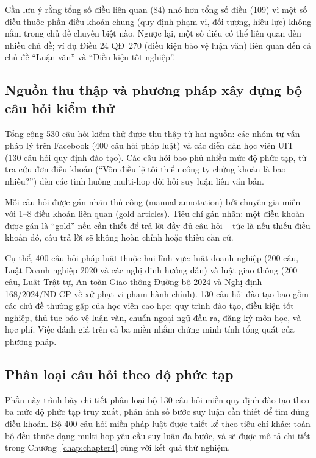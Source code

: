 Cần lưu ý rằng tổng số điều liên quan (84) nhỏ hơn tổng số điều (109) vì một số
điều thuộc phần điều khoản chung (quy định phạm vi, đối tượng, hiệu lực) không
nằm trong chủ đề chuyên biệt nào. Ngược lại, một số điều có thể liên quan đến
nhiều chủ đề; ví dụ Điều 24 QĐ~270 (điều kiện bảo vệ luận văn) liên quan đến cả
chủ đề ``Luận văn'' và ``Điều kiện tốt nghiệp''.

\subsection{Nguồn thu thập và phương pháp xây dựng bộ câu hỏi kiểm thử}
\label{subsec:nguon_thuthap}

Tổng cộng 530 câu hỏi kiểm thử được thu thập từ hai nguồn: các nhóm tư vấn pháp
lý trên Facebook (400 câu hỏi pháp luật) và các diễn đàn học viên UIT (130 câu
hỏi quy định đào tạo). Các câu hỏi bao phủ nhiều mức độ phức tạp, từ tra
cứu đơn điều khoản (``Vốn điều lệ tối thiểu công ty chứng khoán là bao nhiêu?'')
đến các tình huống multi-hop đòi hỏi suy luận liên văn bản.

Mỗi câu hỏi được gán nhãn thủ công (manual annotation) bởi chuyên gia miền với
1--8 điều khoản liên quan (gold articles). Tiêu chí gán nhãn: một điều khoản được
gán là ``gold'' nếu cần thiết để trả lời đầy đủ câu hỏi -- tức là nếu thiếu điều
khoản đó, câu trả lời sẽ không hoàn chỉnh hoặc thiếu căn cứ.

Cụ thể, 400 câu hỏi pháp luật thuộc hai lĩnh vực: luật doanh nghiệp (200 câu,
Luật Doanh nghiệp 2020 và các nghị định hướng dẫn) và luật giao thông (200 câu,
Luật Trật tự, An toàn Giao thông Đường bộ 2024 và Nghị định 168/2024/NĐ-CP về
xử phạt vi phạm hành chính). 130 câu hỏi đào tạo bao gồm các chủ đề thường gặp
của học viên cao học: quy trình đào tạo, điều kiện tốt nghiệp, thủ tục bảo vệ luận
văn, chuẩn ngoại ngữ đầu ra, đăng ký môn học, và học phí. Việc đánh giá trên cả
ba miền nhằm chứng minh tính tổng quát của phương pháp.

\subsection{Phân loại câu hỏi theo độ phức tạp}
\label{subsec:phanloa_cauhoi}

Phần này trình bày chi tiết phân loại bộ 130 câu hỏi miền quy định đào tạo theo ba mức độ phức tạp truy xuất, phản ánh số bước suy luận cần thiết để tìm đúng điều khoản. Bộ 400 câu hỏi miền pháp luật được thiết kế theo tiêu chí khác: toàn bộ đều thuộc dạng multi-hop yêu cầu suy luận đa bước, và sẽ được mô tả chi tiết trong Chương~\ref{chap:chapter4} cùng với kết quả thử nghiệm.

